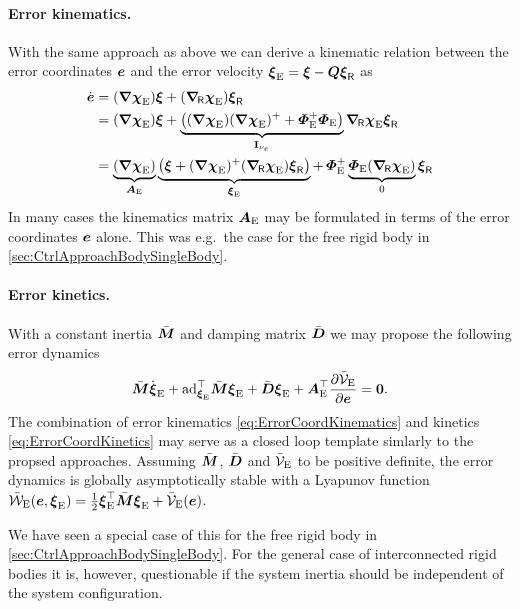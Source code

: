 \paragraph{Error kinematics.}
With the same approach as above we can derive a kinematic relation between the error coordinates $\sysCoordE$ and the error velocity $\sysVelE = \sysVel - \sysTransportMap \sysVelR$ as
\begin{align}\label{eq:ErrorCoordKinematics}
 \sysCoordEd &= (\differential \sysCoordFktE) \sysVel + (\differentialR \sysCoordFktE) \sysVelR
\nonumber\\
 &= (\differential \sysCoordFktE) \sysVel + \underbrace{\big( (\differential \sysCoordFktE) (\differential \sysCoordFktE)^+ + \geoConstraintMatE^+ \geoConstraintMatE \big)}_{\idMat[\numCoordE]} \differentialR \sysCoordFktE \sysVelR
\nonumber\\
 &= \underbrace{(\differential \sysCoordFktE)}_{\kinMat_\idxErr} \underbrace{\big( \sysVel + (\differential \sysCoordFktE)^+ (\differentialR \sysCoordFktE) \sysVelR \big)}_{\sysVelE} +\,\geoConstraintMatE^+ \underbrace{\geoConstraintMatE (\differentialR \sysCoordFktE)}_{0} \sysVelR
\end{align}
In many cases the kinematics matrix $\kinMat_\idxErr$ may be formulated in terms of the error coordinates $\sysCoordE$ alone. 
This was e.g.\ the case for the free rigid body in \autoref{sec:CtrlApproachBodySingleBody}.

\paragraph{Error kinetics.}
With a constant inertia $\sysInertiaMatC$ and damping matrix $\sysDissMatC$ we may propose the following error dynamics
\begin{align}\label{eq:ErrorCoordKinetics}
 \sysInertiaMatC \sysVelEd + \ad{\sysVelE{}{}}^\top \sysInertiaMatC{}{} \sysVelE{}{} + \sysDissMatC \sysVelE + \kinMat_\idxErr^\top \pdiff[\potentialEnergyC_\idxErr]{\sysCoordE} = \tuple{0}.
\end{align}
The combination of error kinematics \eqref{eq:ErrorCoordKinematics} and kinetics \eqref{eq:ErrorCoordKinetics} may serve as a closed loop template simlarly to the propsed approaches.
Assuming $\sysInertiaMatC$, $\sysDissMatC$ and $\potentialEnergyC_\idxErr$ to be positive definite, the error dynamics is globally asymptotically stable with a Lyapunov function $\totalEnergyC_\idxErr(\sysCoordE, \sysVelE) = \frac{1}{2} \sysVelE^\top \sysInertiaMatC \sysVelE + \potentialEnergyC_\idxErr(\sysCoordE)$.

We have seen a special case of this for the free rigid body in \autoref{sec:CtrlApproachBodySingleBody}.
For the general case of interconnected rigid bodies it is, however, questionable if the system inertia should be independent of the system configuration.

